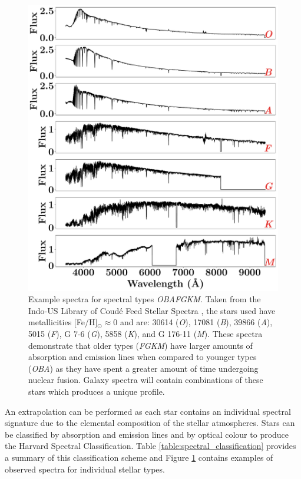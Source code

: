 \documentclass[12pt, twocolumn, nofootinbib]{revtex4-1}    %
\begin{document}
\begin{figure}
\includegraphics[width=1.0\linewidth]{introduction/spectral_types}
\caption{Example spectra for spectral types \textit{OBAFGKM}. Taken from the Indo-US Library of Coudé Feed Stellar Spectra \citep{2004ApJS..152..251V}, the stars used have metallicities [Fe/H]$_{\odot} \approx0$  and are: 30614 (\textit{O}), 17081 (\textit{B}), 39866 (\textit{A}), 5015 (\textit{F}), G 7-6 (\textit{G}), 5858 (\textit{K}), and G 176-11 (\textit{M}). These spectra demonstrate that older types (\textit{FGKM}) have larger amounts of absorption and emission lines when compared to younger types (\textit{OBA}) as they have spent a greater amount of time undergoing nuclear fusion. Galaxy spectra will contain combinations of these stars which produces a unique profile.}
\label{fig:spectral_types}
\end{figure}

An extrapolation can be performed as each star contains an individual spectral signature due to the elemental composition of the stellar atmospheres. Stars can be classified by absorption and emission lines and by optical colour to produce the Harvard Spectral Classification. Table \ref{table:spectral_classification} provides a summary of this classification scheme and Figure \ref{fig:spectral_types} contains examples of observed spectra for individual stellar types. 
\end{document}
